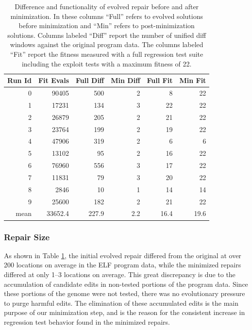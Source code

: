 \documentclass{sigcomm-alternate}
\begin{document}
\begin{table}[htb]
\centering
\begin{tabular}{rrrrrr}
Run Id & Fit Evals & Full Diff & Min Diff & Full Fit & Min Fit \\
\toprule
0      & 90405     & 500       & 2        & 8        & 22      \\
1      & 17231     & 134       & 3        & 22       & 22      \\
2      & 26879     & 205       & 2        & 21       & 22      \\
3      & 23764     & 199       & 2        & 19       & 22      \\
4      & 47906     & 319       & 2        & 6        & 6       \\
5      & 13102     & 95        & 2        & 16       & 22      \\
6      & 76960     & 556       & 3        & 17       & 22      \\
7      & 11831     & 79        & 3        & 20       & 22      \\
8      & 2846      & 10        & 1        & 14       & 14      \\
9      & 25600     & 182       & 2        & 21       & 22      \\
\bottomrule
mean   & 33652.4   & 227.9     & 2.2      & 16.4     & 19.6    \\
\end{tabular}
\caption{\label{minimized-stats}Difference and functionality of
evolved repair before and after minimization.  In these columns ``Full''
refers to evolved solutions before minimization and ``Min'' refers to
post-minimization solutions.  Columns labeled ``Diff'' report the number
of unified diff windows against the original program data. The columns
labeled ``Fit'' report the fitness measured with a full regression test
suite including the exploit tests with a maximum fitness of 22.}
\end{table}

\subsubsection{Repair Size}
\label{sec-4-2-3}
As shown in Table \ref{minimized-stats}, the initial evolved repair differed
from the original at over 200 locations on average in the ELF program
data, while the minimized repairs differed at only 1--3 locations on
average.  This great discrepancy is due to the accumulation of candidate edits
in non-tested portions of the program data.  Since these portions of
the genome were not tested, there was no evolutionary pressure to purge
harmful edits.  The elimination of these accumulated edits is the main
purpose of our minimization step, and is the reason for the consistent
increase in regression test behavior found in the minimized repairs.
\end{document}
